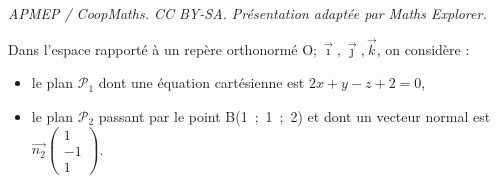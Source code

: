 \documentclass[10pt]{article}
\providecommand{\vect}[1]{\overrightarrow{#1}}
\providecommand{\Oijk}{\(\mathrm{O};\vec{\imath},\vec{\jmath},\vec{k}\)}
\begin{document}
\noindent\textit{APMEP / CoopMaths. CC BY-SA. Présentation adaptée par Maths Explorer.}\par\medskip
\medskip

Dans l'espace rapporté à un repère orthonormé \Oijk, on considère :

\begin{itemize}
\item[$\bullet~~$]le plan $\mathcal{P}_1$ dont une équation cartésienne est $2x + y - z +2 = 0$,
\item[$\bullet~~$]le plan $\mathcal{P}_2$ passant par le point B(1~;~1~;~2) et dont un vecteur normal est $\vect{n_2}\begin{pmatrix}1\\-1\\1\end{pmatrix}$.
\end{itemize}
\end{document}

